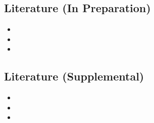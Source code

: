 \subsection{Literature (In Preparation)}

\begin{frame}{\insertsubsection}
  \begin{itemize}
    \item
    
    \item
    
    \item
  \end{itemize}
\end{frame}



\subsection{Literature (Supplemental)}

\begin{frame}{\insertsubsection}
  \begin{itemize}
    \item
    
    \item
    
    \item
  \end{itemize}
\end{frame}
